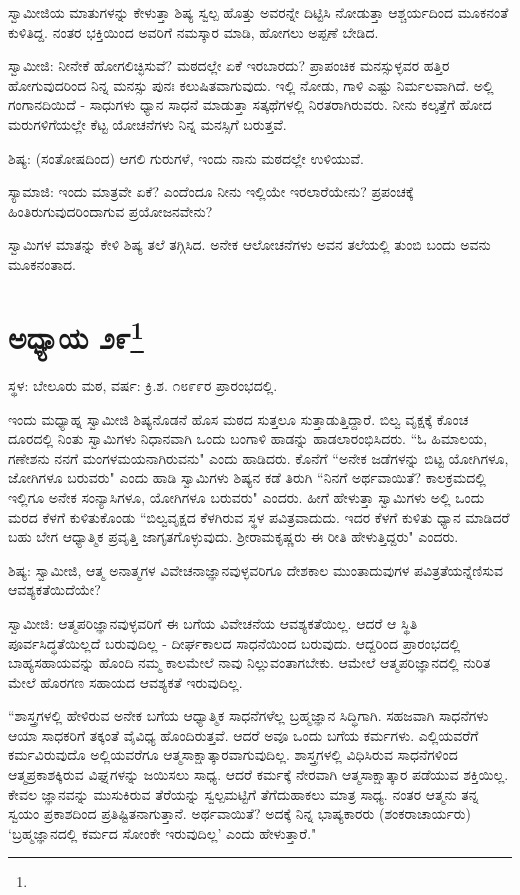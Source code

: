 ಸ್ವಾಮೀಜಿಯ ಮಾತುಗಳನ್ನು ಕೇಳುತ್ತಾ ಶಿಷ್ಯ ಸ್ವಲ್ಪ ಹೊತ್ತು ಅವರನ್ನೇ ದಿಟ್ಟಿಸಿ ನೋಡುತ್ತಾ ಆಶ್ಚರ್ಯದಿಂದ ಮೂಕನಂತೆ ಕುಳಿತಿದ್ದ. ನಂತರ ಭಕ್ತಿಯಿಂದ ಅವರಿಗೆ ನಮಸ್ಕಾರ ಮಾಡಿ, ಹೋಗಲು ಅಪ್ಪಣೆ ಬೇಡಿದ.

ಸ್ವಾಮೀಜಿ: ನೀನೇಕೆ ಹೋಗಲಿಚ್ಛಿಸುವೆ? ಮಠದಲ್ಲೇ ಏಕೆ ಇರಬಾರದು? ಪ್ರಾಪಂಚಿಕ ಮನಸ್ಸುಳ್ಳವರ ಹತ್ತಿರ ಹೋಗುವುದರಿಂದ ನಿನ್ನ ಮನಸ್ಸು ಪುನಃ ಕಲುಷಿತವಾಗುವುದು. ಇಲ್ಲಿ ನೋಡು, ಗಾಳಿ ಎಷ್ಟು ನಿರ್ಮಲವಾಗಿದೆ. ಅಲ್ಲಿ ಗಂಗಾನದಿಯಿದೆ - ಸಾಧುಗಳು ಧ್ಯಾನ ಸಾಧನೆ ಮಾಡುತ್ತಾ ಸತ್ಕಥೆಗಳಲ್ಲಿ ನಿರತರಾಗಿರುವರು. ನೀನು ಕಲ್ಕತ್ತೆಗೆ ಹೋದ ಮರುಗಳಿಗೆಯಲ್ಲೇ ಕೆಟ್ಟ ಯೋಚನೆಗಳು ನಿನ್ನ ಮನಸ್ಸಿಗೆ ಬರುತ್ತವೆ.

ಶಿಷ್ಯ: (ಸಂತೋಷದಿಂದ) ಆಗಲಿ ಗುರುಗಳೆ, ಇಂದು ನಾನು ಮಠದಲ್ಲೇ ಉಳಿಯುವೆ.

ಸ್ಯಾಮಾಜಿ: ಇಂದು ಮಾತ್ರವೇ ಏಕೆ? ಎಂದೆಂದೂ ನೀನು ಇಲ್ಲಿಯೇ ಇರಲಾರೆಯೇನು? ಪ್ರಪಂಚಕ್ಕೆ ಹಿಂತಿರುಗುವುದರಿಂದಾಗುವ ಪ್ರಯೋಜನವೇನು?

ಸ್ವಾಮಿಗಳ ಮಾತನ್ನು ಕೇಳಿ ಶಿಷ್ಯ ತಲೆ ತಗ್ಗಿಸಿದ. ಅನೇಕ ಆಲೋಚನೆಗಳು ಅವನ ತಲೆಯಲ್ಲಿ ತುಂಬಿ ಬಂದು ಅವನು ಮೂಕನಂತಾದ.

\newpage

\chapter[ಅಧ್ಯಾಯ ೨೯]{ಅಧ್ಯಾಯ ೨೯\protect\footnote{}}

\centerline{ಸ್ಥಳ: ಬೇಲೂರು ಮಠ, ವರ್ಷ: ಕ್ರಿ.ಶ. ೧೮೯೯ರ ಪ್ರಾರಂಭದಲ್ಲಿ.}

ಇಂದು ಮಧ್ಯಾಹ್ನ ಸ್ವಾಮೀಜಿ ಶಿಷ್ಯನೊಡನೆ ಹೊಸ ಮಠದ ಸುತ್ತಲೂ ಸುತ್ತಾಡುತ್ತಿದ್ದಾರೆ. ಬಿಲ್ವ ವೃಕ್ಷಕ್ಕೆ ಕೊಂಚ ದೂರದಲ್ಲಿ ನಿಂತು ಸ್ವಾಮಿಗಳು ನಿಧಾನವಾಗಿ ಒಂದು ಬಂಗಾಳಿ ಹಾಡನ್ನು ಹಾಡಲಾರಂಭಿಸಿದರು. “ಓ ಹಿಮಾಲಯ, ಗಣೇಶನು ನನಗೆ ಮಂಗಳಮಯನಾಗಿರುವನು" ಎಂದು ಹಾಡಿದರು. ಕೊನೆಗೆ “ಅನೇಕ ಜಡೆಗಳನ್ನು ಬಿಟ್ಟ ಯೋಗಿಗಳೂ, ಜೋಗಿಗಳೂ ಬರುವರು" ಎಂದು ಹಾಡಿ ಸ್ವಾಮಿಗಳು ಶಿಷ್ಯನ ಕಡೆ ತಿರುಗಿ “ನಿನಗೆ ಅರ್ಥವಾಯಿತೆ? ಕಾಲಕ್ರಮದಲ್ಲಿ ಇಲ್ಲಿಗೂ ಅನೇಕ ಸಂನ್ಯಾಸಿಗಳೂ, ಯೋಗಿಗಳೂ ಬರುವರು" ಎಂದರು. ಹೀಗೆ ಹೇಳುತ್ತಾ ಸ್ವಾಮಿಗಳು ಅಲ್ಲಿ ಒಂದು ಮರದ ಕೆಳಗೆ ಕುಳಿತುಕೊಂಡು “ಬಿಲ್ವವೃಕ್ಷದ ಕೆಳಗಿರುವ ಸ್ಥಳ ಪವಿತ್ರವಾದುದು. ಇದರ ಕೆಳಗೆ ಕುಳಿತು ಧ್ಯಾನ ಮಾಡಿದರೆ ಬಹು ಬೇಗ ಆಧ್ಯಾತ್ಮಿಕ ಪ್ರವೃತ್ತಿ ಜಾಗೃತಗೊಳ್ಳುವುದು. ಶ‍್ರೀರಾಮಕೃಷ್ಣರು ಈ ರೀತಿ ಹೇಳುತ್ತಿದ್ದರು" ಎಂದರು.

ಶಿಷ್ಯ: ಸ್ವಾಮೀಜಿ, ಆತ್ಮ ಅನಾತ್ಮಗಳ ವಿವೇಚನಾಜ್ಞಾನವುಳ್ಳವರಿಗೂ ದೇಶಕಾಲ ಮುಂತಾದುವುಗಳ ಪವಿತ್ರತೆಯನ್ನೆಣಿಸುವ ಆವಶ್ಯಕತೆಯಿದೆಯೇ?

ಸ್ವಾಮೀಜಿ: ಆತ್ಮಪರಿಜ್ಞಾನವುಳ್ಳವರಿಗೆ ಈ ಬಗೆಯ ವಿವೇಚನೆಯ ಆವಶ್ಯಕತೆಯಿಲ್ಲ. ಆದರೆ ಆ ಸ್ಥಿತಿ ಪೂರ್ವಸಿದ್ಧತೆಯಿಲ್ಲದೆ ಬರುವುದಿಲ್ಲ - ದೀರ್ಘಕಾಲದ ಸಾಧನೆಯಿಂದ ಬರುವುದು. ಆದ್ದರಿಂದ ಪ್ರಾರಂಭದಲ್ಲಿ ಬಾಹ್ಯಸಹಾಯವನ್ನು ಹೊಂದಿ ನಮ್ಮ ಕಾಲಮೇಲೆ ನಾವು ನಿಲ್ಲುವಂತಾಗಬೇಕು. ಆಮೇಲೆ ಆತ್ಮಪರಿಜ್ಞಾನದಲ್ಲಿ ನುರಿತ ಮೇಲೆ ಹೊರಗಣ ಸಹಾಯದ ಆವಶ್ಯಕತೆ ಇರುವುದಿಲ್ಲ.

“ಶಾಸ್ತ್ರಗಳಲ್ಲಿ ಹೇಳಿರುವ ಅನೇಕ ಬಗೆಯ ಆಧ್ಯಾತ್ಮಿಕ ಸಾಧನೆಗಳೆಲ್ಲ ಬ್ರಹ್ಮಜ್ಞಾನ ಸಿದ್ಧಿಗಾಗಿ. ಸಹಜವಾಗಿ ಸಾಧನೆಗಳು ಆಯಾ ಸಾಧಕರಿಗೆ ತಕ್ಕಂತೆ ವೈವಿಧ್ಯ ಹೊಂದಿರುತ್ತವೆ. ಆದರೆ ಅವೂ ಒಂದು ಬಗೆಯ ಕರ್ಮಗಳು. ಎಲ್ಲಿಯವರೆಗೆ ಕರ್ಮವಿರುವುದೊ ಅಲ್ಲಿಯವರೆಗೂ ಆತ್ಮಸಾಕ್ಷಾತ್ಕಾರವಾಗುವುದಿಲ್ಲ. ಶಾಸ್ತ್ರಗಳಲ್ಲಿ ವಿಧಿಸಿರುವ ಸಾಧನೆಗಳಿಂದ ಆತ್ಮಪ್ರಕಾಶಕ್ಕಿರುವ ವಿಘ್ನಗಳನ್ನು ಜಯಿಸಲು ಸಾಧ್ಯ. ಆದರೆ ಕರ್ಮಕ್ಕೆ ನೇರವಾಗಿ ಆತ್ಮಸಾಕ್ಷಾತ್ಕಾರ ಪಡೆಯುವ ಶಕ್ತಿಯಿಲ್ಲ. ಕೇವಲ ಜ್ಞಾನವನ್ನು ಮುಸುಕಿರುವ ತೆರೆಯನ್ನು ಸ್ವಲ್ಪಮಟ್ಟಿಗೆ ತೆಗೆದುಹಾಕಲು ಮಾತ್ರ ಸಾಧ್ಯ. ನಂತರ ಆತ್ಮನು ತನ್ನ ಸ್ವಯಂ ಪ್ರಕಾಶದಿಂದ ಪ್ರತಿಷ್ಟಿತನಾಗುತ್ತಾನೆ. ಅರ್ಥವಾಯಿತೆ? ಅದಕ್ಕೆ ನಿನ್ನ ಭಾಷ್ಯಕಾರರು (ಶಂಕರಾಚಾರ್ಯರು) ‘ಬ್ರಹ್ಮಜ್ಞಾನದಲ್ಲಿ ಕರ್ಮದ ಸೋಂಕೇ ಇರುವುದಿಲ್ಲ’ ಎಂದು ಹೇಳುತ್ತಾರೆ."

